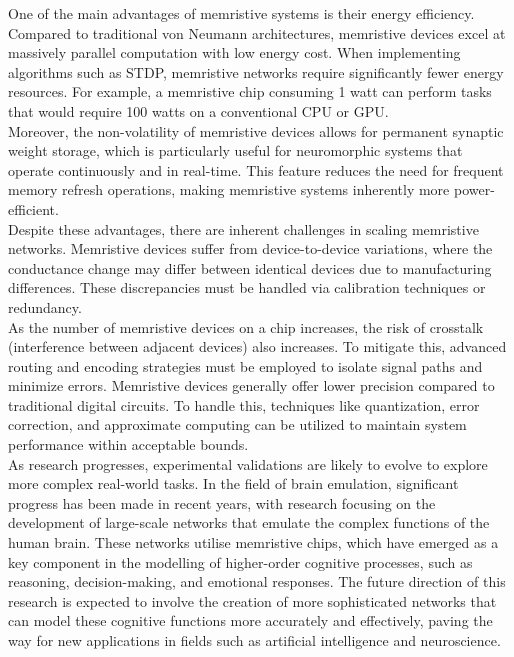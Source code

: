 \noindent One of the main advantages of memristive systems is their energy efficiency. Compared to traditional von Neumann architectures, memristive devices excel at massively parallel computation with low energy cost. When implementing algorithms such as STDP, memristive networks require significantly fewer energy resources. For example, a memristive chip consuming 1 watt can perform tasks that would require 100 watts on a conventional CPU or GPU. \\

\noindent Moreover, the non-volatility of memristive devices allows for permanent synaptic weight storage, which is particularly useful for neuromorphic systems that operate continuously and in real-time. This feature reduces the need for frequent memory refresh operations, making memristive systems inherently more power-efficient.\\

\noindent Despite these advantages, there are inherent challenges in scaling memristive networks. Memristive devices suffer from device-to-device variations, where the conductance change may differ between identical devices due to manufacturing differences. These discrepancies must be handled via calibration techniques or redundancy. \\

\noindent As the number of memristive devices on a chip increases, the risk of crosstalk (interference between adjacent devices) also increases. To mitigate this, advanced routing and encoding strategies must be employed to isolate signal paths and minimize errors. Memristive devices generally offer lower precision compared to traditional digital circuits. To handle this, techniques like quantization, error correction, and approximate computing can be utilized to maintain system performance within acceptable bounds.\\

\noindent As research progresses, experimental validations are likely to evolve to explore more complex real-world tasks. In the field of brain emulation, significant progress has been made in recent years, with research focusing on the development of large-scale networks that emulate the complex functions of the human brain. These networks utilise memristive chips, which have emerged as a key component in the modelling of higher-order cognitive processes, such as reasoning, decision-making, and emotional responses. The future direction of this research is expected to involve the creation of more sophisticated networks that can model these cognitive functions more accurately and effectively, paving the way for new applications in fields such as artificial intelligence and neuroscience. \\

